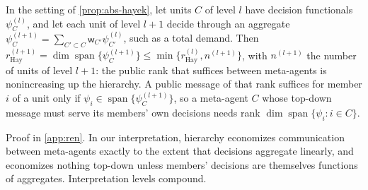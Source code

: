 \begin{proposition}\label{prop:ren-hayek}
In the setting of \cref{prop:abs-hayek}, let units $C$ of level $l$ have decision functionals $\psi^{(l)}_C$, and let each unit of level $l+1$ decide through an aggregate $\psi^{(l+1)}_C=\sum_{C'\subset C}\mathsf w_{C'}\psi^{(l)}_{C'}$, such as a total demand. Then $r^{(l+1)}_{\mathrm{Hay}}=\dim\operatorname{span}\{\psi^{(l+1)}_C\}\le\min\{r^{(l)}_{\mathrm{Hay}},n^{(l+1)}\}$, with $n^{(l+1)}$ the number of units of level $l+1$: the public rank that suffices between meta-agents is nonincreasing up the hierarchy. A public message of that rank suffices for member $i$ of a unit only if $\psi_i\in\operatorname{span}\{\psi^{(l+1)}_C\}$, so a meta-agent $C$ whose top-down message must serve its members' own decisions needs rank $\dim\operatorname{span}\{\psi_i:i\in C\}$.
\end{proposition}
Proof in \cref{app:ren}. In our interpretation, hierarchy economizes communication between meta-agents exactly to the extent that decisions aggregate linearly, and economizes nothing top-down unless members' decisions are themselves functions of aggregates. Interpretation levels compound.


